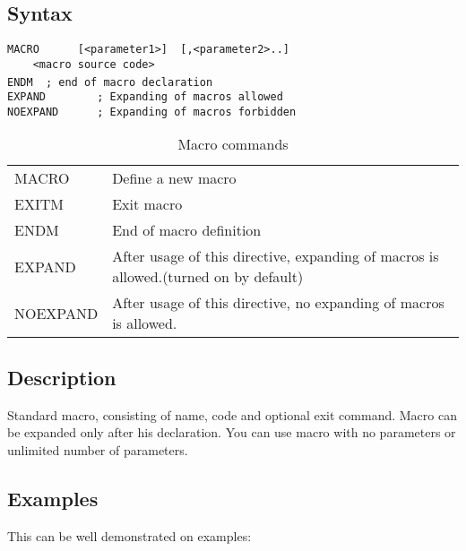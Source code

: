     \subsection{Syntax}
        {
            \usecodefont
            \verb'MACRO      [<parameter1>]  [,<parameter2>..]'\\
            \verb'    <macro source code>'\\
            \verb'ENDM  ; end of macro declaration '
            ~\\
            \usecodefont
            \verb'EXPAND        ; Expanding of macros allowed'\\
            \verb'NOEXPAND      ; Expanding of macros forbidden '\\
        }

        \begin{table}[h!]
            \begin{tabular}{|ll|}
                \hline
                MACRO      & Define a new macro \\
                EXITM      & Exit macro  \\
                ENDM       & End of macro definition \\
                EXPAND     & After usage of this directive, expanding of macros is allowed.(turned on by default)\\
                NOEXPAND   & After usage of this directive, no expanding of macros is allowed.\\
                \hline
            \end{tabular}
            \caption{Macro commands}
        \end{table}

    \subsection{Description}
        Standard macro, consisting of name, code and optional exit command. Macro can be expanded only after his declaration. You can use macro with no parameters  or unlimited number of parameters.

    \subsection{Examples}
        This can be well demonstrated on examples:

